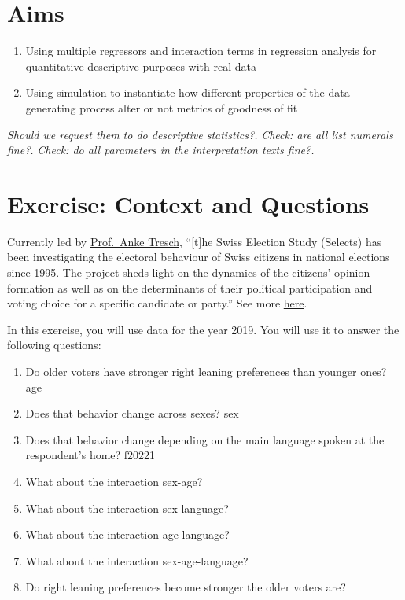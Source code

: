 \documentclass[
]{book}
\providecommand{\tightlist}{%
  \setlength{\itemsep}{0pt}\setlength{\parskip}{0pt}}
\begin{document}
\hypertarget{aims-2}{%
\section{Aims}\label{aims-2}}

\begin{enumerate}
\def\labelenumi{\arabic{enumi}.}
\tightlist
\item
  Using multiple regressors and interaction terms in regression analysis for quantitative descriptive purposes with real data
\item
  Using simulation to instantiate how different properties of the data generating process alter or not metrics of goodness of fit
\end{enumerate}

\emph{{Should we request them to do descriptive statistics?}.}
\emph{{Check: are all list numerals fine?}.}
\emph{{Check: do all parameters in the interpretation texts fine?}.}

\hypertarget{exercise-context-and-questions}{%
\section{Exercise: Context and Questions}\label{exercise-context-and-questions}}

Currently led by \href{https://forscenter.ch/staff/anke-tresch/}{Prof.~Anke Tresch}, ``{[}t{]}he Swiss Election Study (Selects) has been investigating the electoral behaviour of Swiss citizens in national elections since 1995. The project sheds light on the dynamics of the citizens' opinion formation as well as on the determinants of their political participation and voting choice for a specific candidate or party.'' See more \href{https://forscenter.ch/projects/selects/}{here}.

In this exercise, you will use data for the year 2019. You will use it to answer the following questions:

\begin{enumerate}
\def\labelenumi{\arabic{enumi}.}
\tightlist
\item
  Do older voters have stronger right leaning preferences than younger ones? age
\item
  Does that behavior change across sexes? sex
\item
  Does that behavior change depending on the main language spoken at the respondent's home? f20221
\item
  What about the interaction sex-age?
\item
  What about the interaction sex-language?
\item
  What about the interaction age-language?
\item
  What about the interaction sex-age-language?
\item
  Do right leaning preferences become stronger the older voters are?
\end{enumerate}
\end{document}
